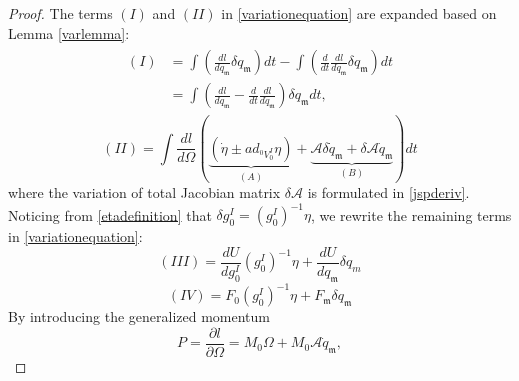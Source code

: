 \documentclass[lettersize,journal]{IEEEtran}
\def \m  {\mathfrak{m}}
\def \A {\mathcal{A}}
\theoremstyle{remark}
\begin{document}
\begin{proof}[Proof]
The terms $(I)$ and $(II)$ in \ref{variationequation} are expanded based on Lemma \ref{varlemma}:
\begin{align}
\begin{split}
     (I) &= \int (\frac{dl}{dq_\mathfrak{m}} \delta q_\mathfrak{m})dt -\int (\frac{d}{dt}\frac{dl}{d\dot{q}_\mathfrak{m}} \delta {q}_\mathfrak{m})dt \\
     &=\int (\frac{dl}{dq_\mathfrak{m}} -\frac{d}{dt}\frac{dl}{d\dot{q}_\mathfrak{m}} )\delta {q}_\mathfrak{m}dt ,
     \end{split}
     \label{lpart1}
\end{align}
\begin{equation}
    (II) = \int  \frac{d l}{d\Omega} (\underbrace{(\dot{\eta}\pm ad_{{}^0V^I_0} \eta)}_{(A)} + \underbrace{\A\delta \dot{q}_\mathfrak{m}+\delta \A\dot{q}_\mathfrak{m}}_{(B)})dt
    \label{lpart2}
\end{equation}
where the variation of total Jacobian matrix $\delta \A$ is formulated in \eqref{jspderiv}.
Noticing from \ref{etadefinition} that $\delta g^I_0=(g^I_0)^{-1}\eta$, we rewrite the remaining terms in \ref{variationequation}:
\begin{equation}
    (III)=\frac{dU}{dg^I_0} (g^I_0)^{-1}\eta+\frac{dU}{dq_\m} \delta q_m
\end{equation}
\begin{equation}
    (IV)= F_0 (g^I_0)^{-1}\eta+ F_\m \delta q_\m
\end{equation}
By introducing the generalized momentum
\begin{equation}
    P=\frac{\partial l}{\partial \Omega}=M_0 \Omega + M_0 \A\dot{q}_\mathfrak{m},
\end{equation}

\end{proof}
\end{document}
